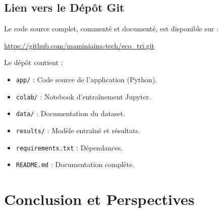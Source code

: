 \documentclass[12pt,a4paper]{report}
\begin{document}
\section{Lien vers le Dépôt Git}
Le code source complet, commenté et documenté, est disponible sur :
\begin{center}
\url{https://github.com/maminiaina-tech/eco_tri.git}
\end{center}

Le dépôt contient :
\begin{itemize}
    \item \texttt{app/} : Code source de l'application (Python).
    \item \texttt{colab/} : Notebook d'entraînement Jupyter.
    \item \texttt{data/} : Documentation du dataset.
    \item \texttt{results/} : Modèle entraîné et résultats.
    \item \texttt{requirements.txt} : Dépendances.
    \item \texttt{README.md} : Documentation complète.
\end{itemize}

\chapter{Conclusion et Perspectives}
\end{document}
